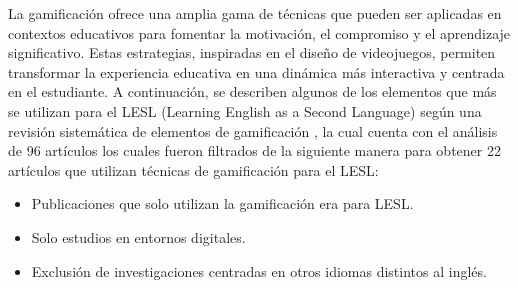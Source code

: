 La gamificación ofrece una amplia gama de técnicas que pueden ser aplicadas en contextos educativos para fomentar la motivación, el compromiso y el aprendizaje significativo. Estas estrategias, inspiradas en el diseño de videojuegos, permiten transformar la experiencia educativa en una dinámica más interactiva y centrada en el estudiante. A continuación, se describen algunos de los elementos que más se utilizan para el LESL (Learning English as a Second Language) según una revisión sistemática de elementos de gamificación \cite{Dehghanzadeh2021}, la cual cuenta con el análisis de 96 artículos los cuales fueron filtrados de la siguiente manera para obtener 22  artículos que utilizan técnicas de gamificación para el LESL:

\newpage
\begin{itemize}
  \item Publicaciones que solo utilizan la gamificación era para LESL.
  \item Solo estudios en entornos digitales.
  \item Exclusión de investigaciones centradas en otros idiomas distintos al inglés.
\end{itemize}

